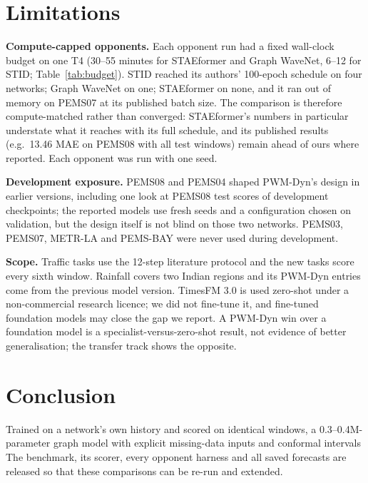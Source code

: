 \section{Limitations}
\label{sec:limits}

\textbf{Compute-capped opponents.} Each opponent run had a fixed wall-clock budget on one T4 (30--55 minutes for
STAEformer and Graph WaveNet, 6--12 for STID; Table~\ref{tab:budget}). STID reached its authors' 100-epoch schedule
on four networks; Graph WaveNet on one; STAEformer on none, and it ran out of memory on PEMS07 at its published batch
size. The comparison is therefore compute-matched rather than converged: STAEformer's numbers in particular
understate what it reaches with its full schedule, and its published results (e.g.\ 13.46 MAE on PEMS08 with all test
windows) remain ahead of ours where reported. Each opponent was run with one seed.

\textbf{Development exposure.} PEMS08 and PEMS04 shaped PWM-Dyn's design in earlier versions, including one look at
PEMS08 test scores of development checkpoints; the reported models use fresh seeds and a configuration chosen on
validation, but the design itself is not blind on those two networks. PEMS03, PEMS07, METR-LA and PEMS-BAY were never
used during development.

\textbf{Scope.} Traffic tasks use the 12-step literature protocol and the new tasks score every sixth window.
Rainfall covers two Indian regions and its PWM-Dyn entries come from the previous model version. TimesFM 3.0 is used
zero-shot under a non-commercial research licence; we did not fine-tune it, and fine-tuned foundation models may
close the gap we report. A PWM-Dyn win over a foundation model is a specialist-versus-zero-shot result, not evidence
of better generalisation; the transfer track shows the opposite.

\section{Conclusion}

Trained on a network's own history and scored on identical windows, a 0.3--0.4M-parameter graph model with
explicit missing-data inputs and conformal intervals  The benchmark, its scorer, every
opponent harness and all saved forecasts are released so that these comparisons can be re-run and extended.
